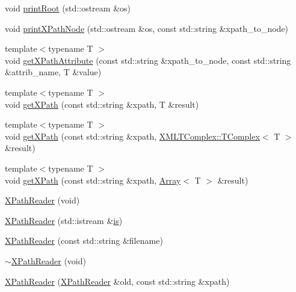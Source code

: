 \begin{DoxyCompactItemize}
\item 
void \mbox{\hyperlink{classXMLXPathReader_1_1XPathReader_a9634a8955fc1b2c8bc086b95f7fa2c1f}{print\+Root}} (std\+::ostream \&os)
\item 
void \mbox{\hyperlink{classXMLXPathReader_1_1XPathReader_a8f751fb071319179252a48075239559c}{print\+X\+Path\+Node}} (std\+::ostream \&os, const std\+::string \&xpath\+\_\+to\+\_\+node)
\item 
{\footnotesize template$<$typename T $>$ }\\void \mbox{\hyperlink{classXMLXPathReader_1_1XPathReader_a0a5ca67826c2c8fdad784a3bbbba4b3c}{get\+X\+Path\+Attribute}} (const std\+::string \&xpath\+\_\+to\+\_\+node, const std\+::string \&attrib\+\_\+name, T \&value)
\item 
{\footnotesize template$<$typename T $>$ }\\void \mbox{\hyperlink{classXMLXPathReader_1_1XPathReader_abbd673bc00e75502126b2cca246ff6f4}{get\+X\+Path}} (const std\+::string \&xpath, T \&result)
\item 
{\footnotesize template$<$typename T $>$ }\\void \mbox{\hyperlink{classXMLXPathReader_1_1XPathReader_a82579390a7b37879a7a7d9b79934a592}{get\+X\+Path}} (const std\+::string \&xpath, \mbox{\hyperlink{classXMLTComplex_1_1TComplex}{X\+M\+L\+T\+Complex\+::\+T\+Complex}}$<$ T $>$ \&result)
\item 
{\footnotesize template$<$typename T $>$ }\\void \mbox{\hyperlink{classXMLXPathReader_1_1XPathReader_a2c16b804ab7842a5bab7a8fe3f433437}{get\+X\+Path}} (const std\+::string \&xpath, \mbox{\hyperlink{classXMLArray_1_1Array}{Array}}$<$ T $>$ \&result)
\item 
\mbox{\hyperlink{classXMLXPathReader_1_1XPathReader_a0f0a3151a7ee18a11d031841dd1aceca}{X\+Path\+Reader}} (void)
\item 
\mbox{\hyperlink{classXMLXPathReader_1_1XPathReader_a3bf8625a1ef55ff3e3f5ffe3afcd27d1}{X\+Path\+Reader}} (std\+::istream \&\mbox{\hyperlink{x_8cc_a81abbbdef81e25584a2eab888e643d3d}{is}})
\item 
\mbox{\hyperlink{classXMLXPathReader_1_1XPathReader_aede8e4b7ed9f4e396b4c6ee1a1e5b846}{X\+Path\+Reader}} (const std\+::string \&filename)
\item 
\mbox{\hyperlink{classXMLXPathReader_1_1XPathReader_aedd43e5673d660cb93b8158166572521}{$\sim$\+X\+Path\+Reader}} (void)
\item 
\mbox{\hyperlink{classXMLXPathReader_1_1XPathReader_ae37728d823bbf1b7f4c09e3f474df32b}{X\+Path\+Reader}} (\mbox{\hyperlink{classXMLXPathReader_1_1XPathReader}{X\+Path\+Reader}} \&old, const std\+::string \&xpath)

\end{DoxyCompactItemize}

